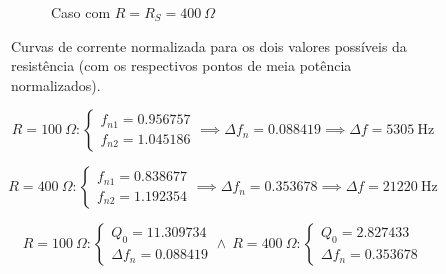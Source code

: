 \begin{figure}[!h]
\begin{subfigure}[b]{0.45\textwidth}
{
    }%
    \caption{Caso com $R=R_S=400\ \Omega$}
    \end{subfigure}
\caption{Curvas de corrente normalizada para os dois valores possíveis da resistência (com os respectivos pontos de meia potência normalizados).} \label{fig:curvas_ressonancia} 
\end{figure}

$$
R=100\ \Omega:
\begin{cases}
    f_{n1} = 0.956757\\
    f_{n2} = 1.045186
\end{cases}
\implies \Delta f_n = 0.088419 \implies \Delta f = 5305\ \text{Hz}
$$

$$
R=400\ \Omega:
\begin{cases}
    f_{n1} = 0.838677\\
    f_{n2} = 1.192354
\end{cases}
\implies \Delta f_n = 0.353678 \implies \Delta f = 21220\ \text{Hz}
$$

$$
R=100\ \Omega:
\begin{cases}
    Q_0 = 11.309734\\
    \Delta f_n = 0.088419
\end{cases}
\land\
R=400\ \Omega:
\begin{cases}
    Q_0 = 2.827433\\
    \Delta f_n = 0.353678
\end{cases}
$$

